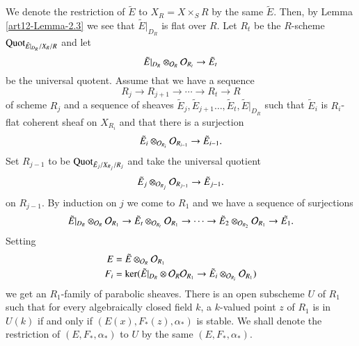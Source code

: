 We denote the restriction of $\tilde{E}$ to $X_{R}=X \times_{S} R $ by the same $\tilde{E}$. Then, by Lemma
\ref{art12-Lemma-2.3} we see that $\tilde{E}|_{D_{R}}$ is flat over $R$. Let $R_{t}$ be the $R$-scheme $\operatorname{Quot}_{\tilde{E}|_{D_{R}}/X_{R}/R}$ and let
$$
\tilde{E}|_{D_{R}} \otimes_{\mathcal{O}_{R}}\mathcal{O}_{R_{t}} \rightarrow \tilde{E}_{t}
$$ 
be the universal quotent. Assume that we have a sequence
$$
R_{j}\rightarrow R_{j+1} \rightarrow \cdots \rightarrow R_{t} \rightarrow R
$$
of scheme $R_{j}$ and a sequence of sheaves $\tilde{E}_{j}, \tilde{E}_{j+1}\ldots, \tilde{E}_{t}, \tilde{E}|_{D_{R}}$ such that $\tilde{E}_{i}$ is $R_{i}$-flat coherent sheaf on $X_{R_{i}}$ and that there is a surjection
$$
\tilde{E}_{i}\otimes_{\mathcal{O}_{R_{i}}}\mathcal{O}_{R_{i-1}} \rightarrow \tilde{E}_{i-1}.
$$
Set $R_{j-1}$ to be $\operatorname{Quot}_{\tilde{E}_{j}/X_{R_{j}}/R_{j}}$ and take the universal quotient
$$
\tilde{E}_{j} \otimes_{\mathcal{O}_{R_{j}}} \mathcal{O}_{R_{j-1}} \rightarrow \tilde{E}_{j-1}.
$$
on $R_{j-1}$. By induction on $j$ we come to $R_{1}$ and we have a sequence of surjections
$$
\tilde{E}|_{D_{R}}\otimes_{\mathcal{O}_{R}}\mathcal{O}_{R_{1}} \rightarrow \tilde{E}_{t}\otimes_{\mathcal{O}_{R_{t}}}\mathcal{O}_{R_{1}} \rightarrow \cdots \rightarrow \tilde{E}_{2}\otimes_{\mathcal{O}_{R_{2}}} \mathcal{O}_{R_{1}}\rightarrow \tilde{E_{1}}.
$$
Setting
\begin{align*}
E&=\tilde{E}\otimes_{\mathcal{O}_{R}} \mathcal{O}_{R_{1}}\\
F_{i}&=\ker(\tilde{E}|_{D_{R}} \otimes\mathcal{O}_{R} \mathcal{O}_{R_{1}} \rightarrow \tilde{E}_{i}\otimes_{\mathcal{O}_{R_{i}}} \mathcal{O}_{R_{1}})
\end{align*}
we get an $R_{1}$-family of parabolic sheaves. There is an open subscheme $U$ of $R_{1}$ such that for every algebraically closed field $k$, a $k$-valued point $z$ of $R_{1}$ is in $U(k)$ if and only if $(E(x), F_{*}(z), \alpha_{*})$ is stable. We shall denote the restriction of $(E, F_{*}, \alpha_{*})$ to $U$ by the same $(E, F_{*}, \alpha_{*})$.


